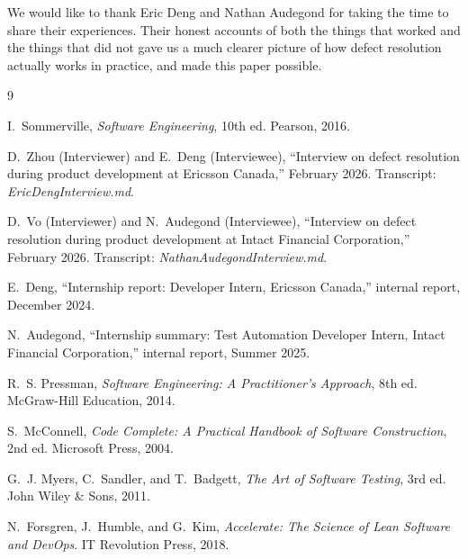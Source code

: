 \documentclass[sigconf]{acmart}
\begin{document}
We would like to thank Eric Deng and Nathan Audegond for taking the time to share their experiences. Their honest accounts of both the things that worked and the things that did not gave us a much clearer picture of how defect resolution actually works in practice, and made this paper possible.

\begin{thebibliography}{9}

I.~Sommerville, \textit{Software Engineering}, 10th ed. Pearson, 2016.

D.~Zhou (Interviewer) and E.~Deng (Interviewee), ``Interview on defect resolution during product development at Ericsson Canada,'' February 2026. Transcript: \textit{EricDengInterview.md}.

D.~Vo (Interviewer) and N.~Audegond (Interviewee), ``Interview on defect resolution during product development at Intact Financial Corporation,'' February 2026. Transcript: \textit{NathanAudegondInterview.md}.

E.~Deng, ``Internship report: Developer Intern, Ericsson Canada,'' internal report, December 2024.

N.~Audegond, ``Internship summary: Test Automation Developer Intern, Intact Financial Corporation,'' internal report, Summer 2025.

R.~S. Pressman, \textit{Software Engineering: A Practitioner's Approach}, 8th ed. McGraw-Hill Education, 2014.

S.~McConnell, \textit{Code Complete: A Practical Handbook of Software Construction}, 2nd ed. Microsoft Press, 2004.

G.~J. Myers, C.~Sandler, and T.~Badgett, \textit{The Art of Software Testing}, 3rd ed. John Wiley \& Sons, 2011.

N.~Forsgren, J.~Humble, and G.~Kim, \textit{Accelerate: The Science of Lean Software and DevOps}. IT Revolution Press, 2018.

\end{thebibliography}
\end{document}
